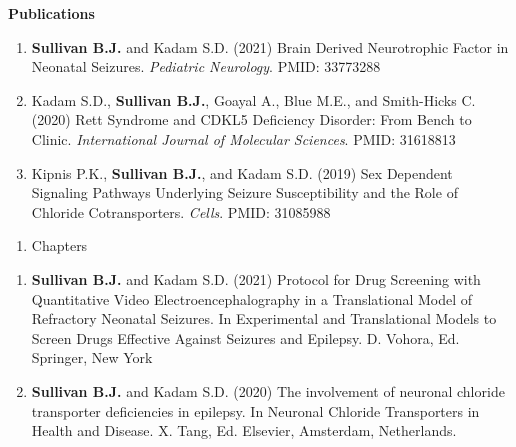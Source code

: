 \documentclass{resume} %
\begin{document}
\begin{rSection}{{\bfseries Publications}}
    \begin{enumerate}[resume, leftmargin=2em]
        \item {\bfseries Sullivan B.J.} and Kadam S.D. (2021) Brain Derived Neurotrophic Factor in Neonatal Seizures. \emph{Pediatric Neurology}. PMID: 33773288 
        \item Kadam S.D., {\bfseries Sullivan B.J.}, Goayal A., Blue M.E., and Smith-Hicks C. (2020) Rett Syndrome and CDKL5 Deficiency Disorder: From Bench to Clinic. \emph{International Journal of Molecular Sciences}. PMID: 31618813 
        \item Kipnis P.K., {\bfseries Sullivan B.J.}, and Kadam S.D. (2019) Sex Dependent Signaling Pathways Underlying Seizure Susceptibility and the Role of Chloride Cotransporters. \emph{Cells}. PMID: 31085988
    \end{enumerate}

    \begin{enumerate}[leftmargin=0pt]
        \item [] Chapters
    \end{enumerate}

    \begin{enumerate}[resume, leftmargin=2em]
        \item {\bfseries Sullivan B.J.} and Kadam S.D. (2021) Protocol for Drug Screening with Quantitative Video Electroencephalography in a Translational Model of Refractory Neonatal Seizures. In Experimental and Translational Models to Screen Drugs Effective Against Seizures and Epilepsy. D. Vohora, Ed. Springer, New York
        \item {\bfseries Sullivan B.J.} and Kadam S.D. (2020) The involvement of neuronal chloride transporter deficiencies in epilepsy. In Neuronal Chloride Transporters in Health and Disease. X. Tang, Ed. Elsevier, Amsterdam, Netherlands.
    \end{enumerate}     
\end{rSection}
\end{document}
